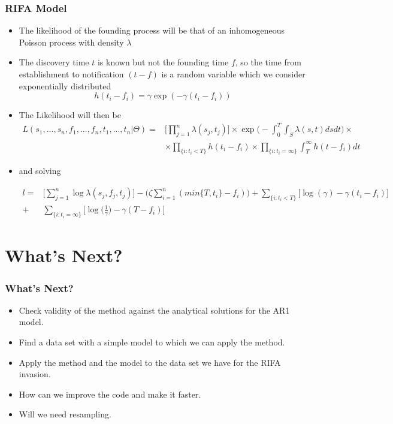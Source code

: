 \documentclass[9pt]{beamer}
\begin{document}
\begin{frame}
\frametitle{RIFA Model}
\begin{itemize}
\item The likelihood of the founding process will be that of an inhomogeneous Poisson process with density $\lambda$
\item The discovery time $t$ is known but not the founding time $f$, so the time from establishment to notification $(t - f)$ is a random variable which we consider exponentially distributed
\[
h(t_{i} - f_{i}) = \gamma \exp (- \gamma(t_{i} - f_{i}))
\]
\item The Likelihood will then be
\[
\begin{aligned}
L(s_{1}, ..., s_{n}, f_{1}, ..., f_{n}, t_{1}, ..., t_{n} | \Theta) = & \Bigg[ \prod_{j=1}^{n} \lambda(s_{j}, t_{j}) \Bigg] \times \exp \Bigg(- \int_{0}^{T} \int_{S} \lambda(s, t) d s d t \Bigg) \times \\ 
& \times \prod_{\{ i : t_{i} < T \} } h (t_{i} - f_{i}) \times \prod_{ \{ i : t_{i} = \infty \} } \int_{T}^{\infty} h(t - f_{i}) d t
\end{aligned}
\]
\item and solving

\[
\begin{aligned}
    l = & \Bigg[ \sum_{j=1}^{n} \log \lambda(s_{j},f_{j}, t_{j}) \Bigg] - \bigg(\zeta \sum_{i=1}^{n} (min\{ T, t_i \} - f_i) \bigg)  + \sum_{\{ i : t_{i} < T \} }  \bigg[\log (\gamma) -\gamma(t_{i} - f_{i}) \bigg] \\
    + & \sum_{ \{ i : t_{i} = \infty \} } \bigg[\log \bigg(\frac{1}{\gamma}\bigg) -\gamma(T - f_{i}) \bigg]
\end{aligned}
\]
\end{itemize}
\end{frame}


\section{What's Next?}

\begin{frame}
\frametitle{What's Next?}
\begin{itemize}
\setlength\itemsep{2em}
    \item Check validity of the method against the analytical solutions for the AR1 model.
    \item Find a data set with a simple model to which we can apply the method.
    \item Apply the method and the model to the data set we have for the RIFA invasion.
    \item How can we improve the code and make it faster.
    \item Will we need resampling.
\end{itemize}
\end{frame}
\end{document}
